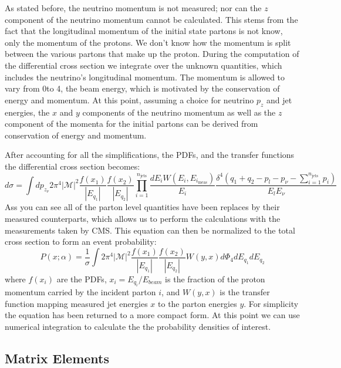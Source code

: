 As stated before, the neutrino momentum is not measured; nor can the $z$ component of the neutrino momentum cannot be calculated.
This stems from the fact that the longitudinal momentum of the initial state partons is not know, only the momentum of the protons.
We don't know how the momentum is split between the various partons that make up the proton.
During the computation of the differential cross section we integrate over the unknown quantities, which includes the neutrino's longitudinal momentum.
The momentum is allowed to vary from 0\gev to 4\tev, the beam energy, which is motivated by the conservation of energy and momentum.
At this point, assuming a choice for neutrino $p_{z}$ and jet energies, the $x$ and $y$ components of the neutrino momentum as well as the $z$ component of the momenta for the initial partons can be derived from conservation of energy and momentum.

After accounting for all the simplifications, the PDFs, and the transfer functions the differential cross section becomes:
\begin{equation}
  d\sigma=\int dp_{z_{\nu}}2\pi^{4}|\mathcal{M}|^{2}\frac{f\left(x_{1}\right)}{|E_{q_{1}}|}\frac{f\left(x_{2}\right)}{|E_{q_{2}}|}\prod_{i=1}^{n_{\text{jets}}}\frac{dE_{i}W\left(E_{i},E_{i_{\text{meas}}}\right)}{E_{i}}\frac{\delta^{4}\left(q_{1}+q_{2}-p_{l}-p_{\nu}-\sum_{i=1}^{n_{\text{jets}}}p_{i}\right)}{E_{l}E_{\nu}}
\end{equation}
Ass you can see all of the parton level quantities have been replaces by their measured counterparts, which allows us to perform the calculations with the measurements taken by CMS.
This equation can then be normalized to the total cross section to form an event probability:
\begin{equation}
P(x;\alpha)=\frac{1}{\sigma}\int2\pi^{4}|\mathcal{M}|^{2}\frac{f\left(x_{1}\right)}{|E_{q_{1}}|}\frac{f\left(x_{2}\right)}{|E_{q_{2}}|}W\left(y,x\right)d\Phi_{4}dE_{q_{1}}dE_{q_{2}}
\end{equation}
where $f\left(x_{i}\right)$ are the PDFs, $x_{i}=E_{q_{i}}/E_{beam}$ is the fraction of the proton momentum carried by the incident parton $i$, and $W\left(y,x\right)$ is the transfer function mapping measured jet energies $x$ to the parton energies $y$.
For simplicity the equation has been returned to a more compact form.
At this point we can use numerical integration to calculate the the probability densities of interest.

\subsection{Matrix Elements}

